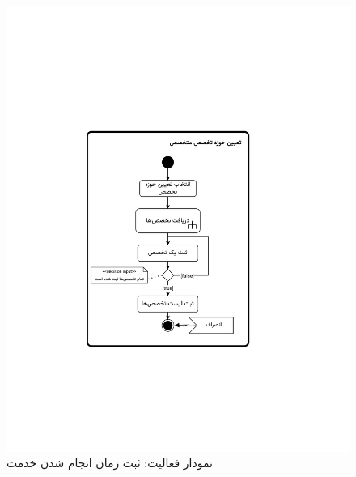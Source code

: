 \begin{figure}
	\centering
	\includegraphics[scale=0.8, page=4]{figs/OOD-activity21-30.pdf}
	\caption{نمودار فعالیت: ثبت زمان انجام شدن خدمت}
\end{figure}
\FloatBarrier
\newpage

